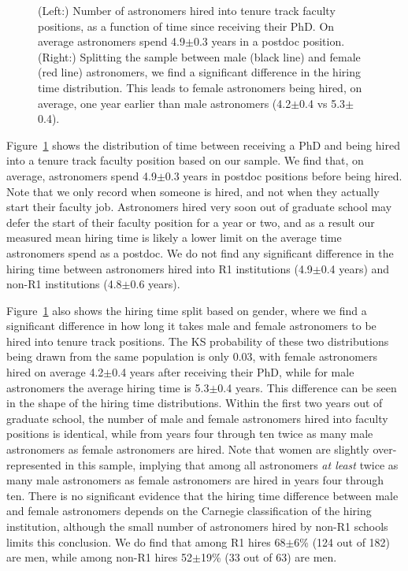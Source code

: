 \documentclass[modern]{aastex62}
\begin{document}
\begin{figure}[!htb]
\caption{(Left:) Number of astronomers hired into tenure track faculty positions, as a function of time since receiving their PhD. On average astronomers spend 4.9$\pm$0.3 years in a postdoc position. 
(Right:) Splitting the sample between male (black line) and female (red line) astronomers, we find a significant difference in the hiring time distribution.  This leads to female astronomers being hired, on average, one year earlier than male astronomers (4.2$\pm$0.4 vs 5.3$\pm$0.4).\label{hiring_time}}
\end{figure}

Figure~\ref{hiring_time} shows the distribution of time between receiving a PhD and being hired into a tenure track faculty position based on our sample. We find that, on average, astronomers spend 4.9$\pm$0.3 years in postdoc positions before being hired. Note that we only record when someone is hired, and not when they actually start their faculty job. Astronomers hired very soon out of graduate school may defer the start of their faculty position for a year or two, and as a result our measured mean hiring time is likely a lower limit on the average time astronomers spend as a postdoc. We do not find any significant difference in the hiring time between astronomers hired into R1 institutions (4.9$\pm$0.4 years) and non-R1 institutions (4.8$\pm$0.6 years). 

Figure~\ref{hiring_time} also shows the hiring time split based on gender, where we find a significant difference in how long it takes male and female astronomers to be hired into tenure track positions. The KS probability of these two distributions being drawn from the same population is only 0.03, with female astronomers hired on average 4.2$\pm$0.4 years after receiving their PhD, while for male astronomers the average hiring time is 5.3$\pm$0.4 years. This difference can be seen in the shape of the hiring time distributions. Within the first two years out of graduate school, the number of male and female astronomers hired into faculty positions is identical, while from years four through ten twice as many male astronomers as female astronomers are hired. Note that women are slightly over-represented in this sample, implying that among all astronomers {\it at least} twice as many male astronomers as female astronomers are hired in years four through ten. There is no significant evidence that the hiring time difference between male and female astronomers depends on the Carnegie classification of the hiring institution, although the small number of astronomers hired by non-R1 schools limits this conclusion. We do find that among R1 hires 68$\pm$6\% (124 out of 182) are men, while among non-R1 hires 52$\pm$19\% (33 out of 63) are men.
\end{document}
